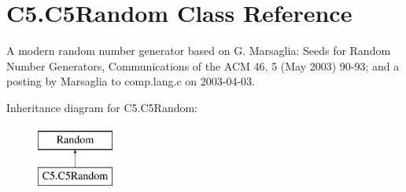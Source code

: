 \hypertarget{class_c5_1_1_c5_random}{}\section{C5.\+C5\+Random Class Reference}
\label{class_c5_1_1_c5_random}


A modern random number generator based on G. Marsaglia\+: Seeds for Random Number Generators, Communications of the A\+C\+M 46, 5 (May 2003) 90-\/93; and a posting by Marsaglia to comp.\+lang.\+c on 2003-\/04-\/03.  


Inheritance diagram for C5.\+C5\+Random\+:\begin{figure}[H]
\begin{center}
\leavevmode
\includegraphics[height=2.000000cm]{class_c5_1_1_c5_random}
\end{center}
\end{figure}
